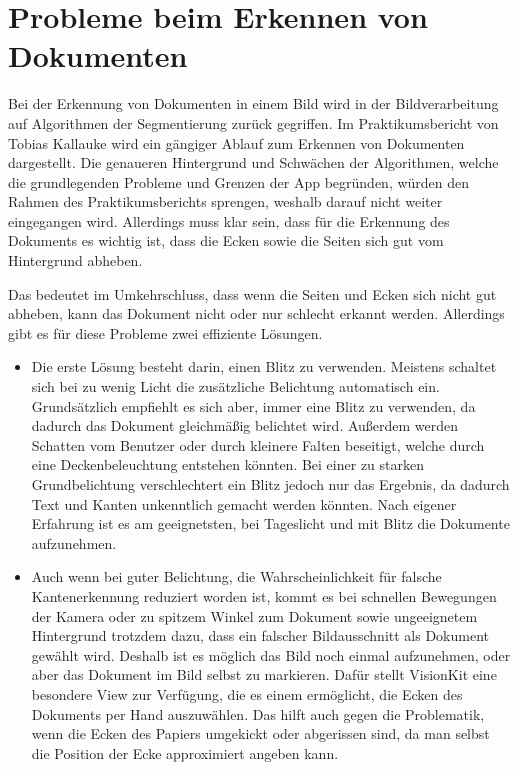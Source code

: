 \documentclass[nomenclature, oneside, 150]{HSMW-Thesis}
\begin{document}
	\section{Probleme beim Erkennen von Dokumenten}\label{sc:erkennen}
		Bei der Erkennung von Dokumenten in einem Bild wird in der Bildverarbeitung auf Algorithmen der Segmentierung zurück gegriffen. Im Praktikumsbericht von Tobias Kallauke wird ein gängiger Ablauf zum Erkennen von Dokumenten dargestellt. Die genaueren Hintergrund und Schwächen der Algorithmen, welche die grundlegenden Probleme und Grenzen der App begründen, würden den Rahmen des Praktikumsberichts sprengen, weshalb darauf nicht weiter eingegangen wird. Allerdings muss klar sein, dass für die Erkennung des Dokuments es wichtig ist, dass die Ecken sowie die Seiten sich gut vom Hintergrund abheben.
		
		Das bedeutet im Umkehrschluss, dass wenn die Seiten und Ecken sich nicht gut abheben, kann das Dokument nicht oder nur schlecht erkannt werden. Allerdings gibt es für diese Probleme zwei effiziente Lösungen. 
		\begin{itemize}
			\item Die erste Lösung besteht darin, einen Blitz zu verwenden. Meistens schaltet sich bei zu wenig Licht die zusätzliche Belichtung automatisch ein. Grundsätzlich empfiehlt es sich aber, immer eine Blitz zu verwenden, da dadurch das Dokument gleichmäßig belichtet wird. Außerdem werden Schatten vom Benutzer oder durch kleinere Falten beseitigt, welche durch eine Deckenbeleuchtung entstehen könnten. Bei einer zu starken Grundbelichtung verschlechtert ein Blitz jedoch nur das Ergebnis, da dadurch Text und Kanten unkenntlich gemacht werden könnten. Nach eigener Erfahrung ist es am geeignetsten, bei Tageslicht und mit Blitz die Dokumente aufzunehmen. 
			\item Auch wenn bei guter Belichtung, die Wahrscheinlichkeit für falsche Kantenerkennung reduziert worden ist, kommt es bei schnellen Bewegungen der Kamera oder zu spitzem Winkel zum Dokument sowie ungeeignetem Hintergrund trotzdem dazu, dass ein falscher Bildausschnitt als Dokument gewählt wird. Deshalb ist es möglich das Bild noch einmal aufzunehmen, oder aber das Dokument im Bild selbst zu markieren. Dafür stellt VisionKit eine besondere View zur Verfügung, die es einem ermöglicht, die Ecken des Dokuments per Hand auszuwählen. Das hilft auch gegen die Problematik, wenn die Ecken des Papiers umgekickt oder abgerissen sind, da man selbst die Position der Ecke approximiert angeben kann. 
		\end{itemize}
		
\end{document}

